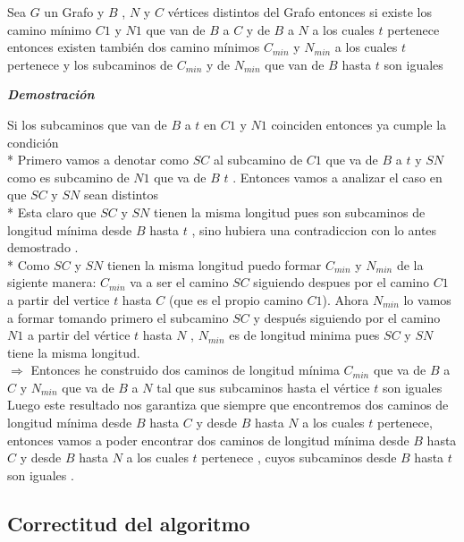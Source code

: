 \documentclass[10pt]{article}
\begin{document}
    \begin{thm}
        Sea $G$ un Grafo y $B$ , $N$ y $C$ v\'ertices distintos  del Grafo entonces si existe los camino m\'inimo $C1$ y $N1$ que van de $B$ a $C$ y de $B$ a $N$ a los cuales $t$ pertenece entonces existen tambi\'en dos camino m\'inimos $C_{min}$ y $N_{min}$ a los cuales $t$ pertenece y los subcaminos de $C_{min}$ y de $N_{min}$ que van de $B$ hasta $t$ son iguales  
    \end{thm}

    \noindent \textit{\textbf{Demostraci\'on}}

    \noindent Si los subcaminos que van de $B$ a $t$ en $C1$ y $N1$  coinciden entonces ya cumple la condici\'on
    \\*
    Primero vamos a denotar como $SC$ al subcamino de $C1$ que va de $B$ a $t$  y $SN$ como es subcamino de $N1$ que va de $B$ $t$ . Entonces vamos a analizar el caso en que $SC$ y $SN$ sean distintos 
    \\*
    Esta claro que $SC$ y $SN$ tienen la misma longitud pues son subcaminos de longitud m\'inima desde $B$ hasta $t$ , sino hubiera una contradiccion con lo antes demostrado . 
    \\*
    Como $SC$ y $SN$ tienen la misma longitud puedo formar $C_{min}$  y $N_{min}$ de la sigiente manera:
    $C_{min}$ va a ser el camino $SC$ siguiendo despues por el camino $C1$ a partir del vertice $t$ hasta $C$ (que es el propio camino $C1$).
    Ahora $N_{min}$ lo vamos a formar tomando primero el subcamino $SC$ y despu\'es siguiendo por el camino $N1$ a partir del v\'ertice $t$ hasta $N$ ,
    $N_{min}$ es de longitud minima pues $SC$ y $SN$ tiene la misma longitud.
    \\[10pt]
    $\Rightarrow$ Entonces he construido dos caminos de longitud m\'inima $C_{min}$ que va de $B$ a $C$ y $N_{min}$ que va de $B$ a $N$  tal que sus subcaminos hasta el v\'ertice $t$ son iguales  
    \\[10pt] 
    Luego este resultado nos garantiza que siempre que encontremos dos caminos de longitud m\'inima desde $B$ hasta $C$ y desde $B$ hasta $N$ a los cuales $t$ pertenece, entonces vamos a poder encontrar dos caminos de  longitud m\'inima desde $B$ hasta $C$ y desde $B$ hasta $N$ a los cuales $t$ pertenece , cuyos subcaminos desde $B$ hasta $t$ son iguales .


    \subsection{Correctitud del algoritmo} 
\end{document}
